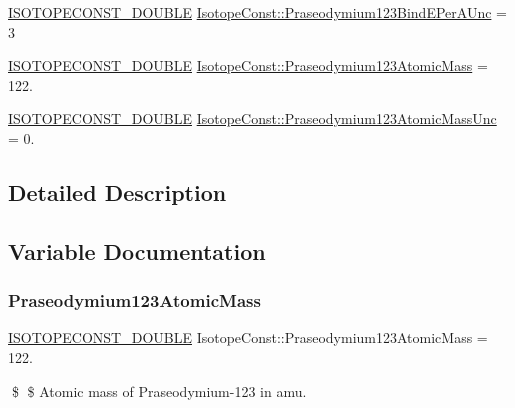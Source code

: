 \begin{DoxyCompactItemize}
\item 
\mbox{\hyperlink{group___isotope_const-_macros_ga8f45a7272ce02c0b4c65c44636ed719a}{I\+S\+O\+T\+O\+P\+E\+C\+O\+N\+S\+T\+\_\+\+D\+O\+U\+B\+LE}} \mbox{\hyperlink{group___isotope_const-_praseodymium-_pr123_ga8c72e96c750465a902b0e2b822881959}{Isotope\+Const\+::\+Praseodymium123\+Bind\+E\+Per\+A\+Unc}} = 3
\item 
\mbox{\hyperlink{group___isotope_const-_macros_ga8f45a7272ce02c0b4c65c44636ed719a}{I\+S\+O\+T\+O\+P\+E\+C\+O\+N\+S\+T\+\_\+\+D\+O\+U\+B\+LE}} \mbox{\hyperlink{group___isotope_const-_praseodymium-_pr123_gaf40a623d701dab234d749a972fd64d18}{Isotope\+Const\+::\+Praseodymium123\+Atomic\+Mass}} = 122.
\item 
\mbox{\hyperlink{group___isotope_const-_macros_ga8f45a7272ce02c0b4c65c44636ed719a}{I\+S\+O\+T\+O\+P\+E\+C\+O\+N\+S\+T\+\_\+\+D\+O\+U\+B\+LE}} \mbox{\hyperlink{group___isotope_const-_praseodymium-_pr123_ga308d0594c3b89192f9aa4b993001c257}{Isotope\+Const\+::\+Praseodymium123\+Atomic\+Mass\+Unc}} = 0.
\end{DoxyCompactItemize}


\subsection{Detailed Description}


\subsection{Variable Documentation}
\mbox{\label{group___isotope_const-_praseodymium-_pr123_gaf40a623d701dab234d749a972fd64d18}} 
\subsubsection{\texorpdfstring{Praseodymium123\+Atomic\+Mass}{Praseodymium123AtomicMass}}
{\footnotesize\ttfamily \mbox{\hyperlink{group___isotope_const-_macros_ga8f45a7272ce02c0b4c65c44636ed719a}{I\+S\+O\+T\+O\+P\+E\+C\+O\+N\+S\+T\+\_\+\+D\+O\+U\+B\+LE}} Isotope\+Const\+::\+Praseodymium123\+Atomic\+Mass = 122.}

\$ \$ Atomic mass of Praseodymium-\/123 in amu. \mbox{\label{group___isotope_const-_praseodymium-_pr123_ga308d0594c3b89192f9aa4b993001c257}} 
